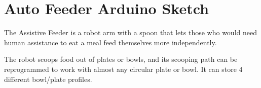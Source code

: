 \chapter{Auto Feeder Arduino Sketch}
\hypertarget{md_readme}{}\label{md_readme}
\label{md_readme_autotoc_md0}%
%


The Assistive Feeder is a robot arm with a spoon that lets those who would need human assistance to eat a meal feed themselves more independently.

The robot scoops food out of plates or bowls, and its scooping path can be reprogrammed to work with almost any circular plate or bowl. It can store 4 different bowl/plate profiles. 